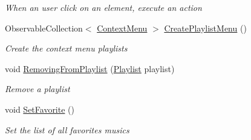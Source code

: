 \begin{DoxyCompactItemize}
\begin{DoxyCompactList}\small\item\em When an user click on an element, execute an action \end{DoxyCompactList}\item 
Observable\+Collection$<$ \hyperlink{class_d_t_o_1_1_context_menu}{Context\+Menu} $>$ \hyperlink{class_presentation_1_1_view_model_1_1_music_view_model_a70004ba66f44fcd3698d991bbc5c2856}{Create\+Playlist\+Menu} ()
\begin{DoxyCompactList}\small\item\em Create the context menu playlists \end{DoxyCompactList}\item 
void \hyperlink{class_presentation_1_1_view_model_1_1_music_view_model_af157154e1dc9f904c30b975626f26a85}{Removing\+From\+Playlist} (\hyperlink{class_d_t_o_1_1_entity_1_1_playlist}{Playlist} playlist)
\begin{DoxyCompactList}\small\item\em Remove a playlist \end{DoxyCompactList}\item 
void \hyperlink{class_presentation_1_1_view_model_1_1_music_view_model_a52a85cc7a7a537cdf36345fc83b5ab80}{Set\+Favorite} ()
\begin{DoxyCompactList}\small\item\em Set the list of all favorites musics \end{DoxyCompactList}\end{DoxyCompactItemize}
